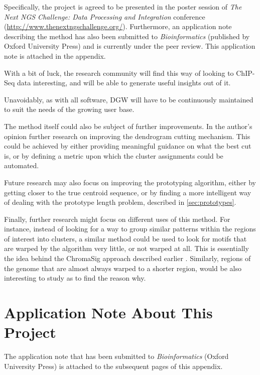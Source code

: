 \documentclass[parskip]{cs4rep}
\begin{document}
Specifically, the project is agreed to be presented in the poster session of \emph{The Next NGS Challenge: Data Processing and Integration} conference (\url{http://www.thenextngschallenge.org/}). Furthermore, an application note describing the method has also been submitted to \emph{Bioinformatics} (published by Oxford University Press) and is currently under the peer review. This application note is attached in the appendix.

With a bit of luck, the research community will find this way of looking to ChIP-Seq data interesting, and will be able to generate useful insights out of it. 

Unavoidably, as with all software, DGW will have to be continuously maintained to suit the needs of the growing user base.

The method itself could also be subject of further improvements. 
In the author's opinion further research on improving the dendrogram cutting mechanism. This could be achieved by either providing meaningful guidance on what the best cut is, or by defining a metric upon which the cluster assignments could be automated.

Future research may also focus on improving the prototyping algorithm, either by getting closer to the true centroid sequence, or by finding a more intelligent way of dealing with the prototype length problem, described in \autoref{sec:prototypes}. 

Finally, further research might focus on different uses of this method. For instance, instead of
looking for a way to group similar patterns within the regions of interest into clusters, a similar
method could be used to look for motifs that are warped by the algorithm very little, or not warped at all. This is essentially the idea behind the ChromaSig approach described earlier \cite{Hon:2008wv}. Similarly, regions of the genome that are almost always warped to a shorter region, would be also interesting to study as to find the reason why.





\appendix
\chapter{Application Note About This Project}
The application note that has been submitted to \emph{Bioinformatics} (Oxford University Press) is attached to the subsequent pages of this appendix.



\label{sec:supplementary-figures}
\end{document}
